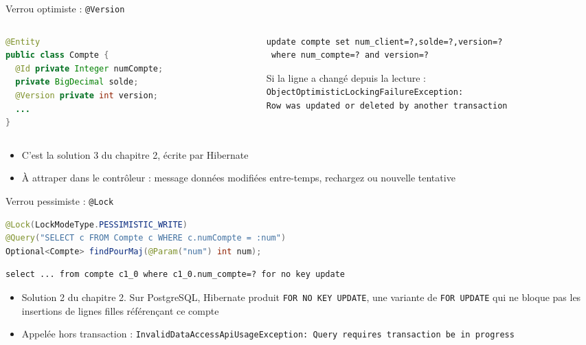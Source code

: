 \documentclass[aspectratio=169,10pt]{beamer}
\begin{document}
\begin{frame}[fragile]{Verrou optimiste : \texttt{@Version}}
  \begin{columns}[T]
    \begin{column}{0.42\textwidth}
\begin{lstlisting}[language=Java]
@Entity
public class Compte {
  @Id private Integer numCompte;
  private BigDecimal solde;
  @Version private int version;
  ...
}
\end{lstlisting}
    \end{column}
    \begin{column}{0.55\textwidth}
\begin{lstlisting}[style=log]
update compte set num_client=?,solde=?,version=?
 where num_compte=? and version=?
\end{lstlisting}
      Si la ligne a chang\'e depuis la lecture :\\[1mm]
      \texttt{\footnotesize ObjectOptimisticLockingFailureException:}\\
      \texttt{\footnotesize Row was updated or deleted by another transaction}
    \end{column}
  \end{columns}
  \vspace{2mm}
  \begin{itemize}
    \item C'est la \og solution 3 \fg{} du chapitre 2, \'ecrite par Hibernate
    \item \`A attraper dans le contr\^oleur : message \og donn\'ees modifi\'ees entre-temps, rechargez \fg{} ou nouvelle tentative
  \end{itemize}
\end{frame}

\begin{frame}[fragile]{Verrou pessimiste : \texttt{@Lock}}
\begin{lstlisting}[language=Java]
@Lock(LockModeType.PESSIMISTIC_WRITE)
@Query("SELECT c FROM Compte c WHERE c.numCompte = :num")
Optional<Compte> findPourMaj(@Param("num") int num);
\end{lstlisting}
\begin{lstlisting}[style=log]
select ... from compte c1_0 where c1_0.num_compte=? for no key update
\end{lstlisting}
  \begin{itemize}
    \item \og Solution 2 \fg{} du chapitre 2. Sur PostgreSQL, Hibernate produit \texttt{FOR NO KEY UPDATE}, une variante de
      \texttt{FOR UPDATE} qui ne bloque pas les insertions de lignes filles r\'ef\'eren\c{c}ant ce compte
    \item Appel\'ee hors transaction : \texttt{InvalidDataAccessApiUsageException: Query requires transaction be in progress}
  \end{itemize}
\end{frame}
\end{document}
